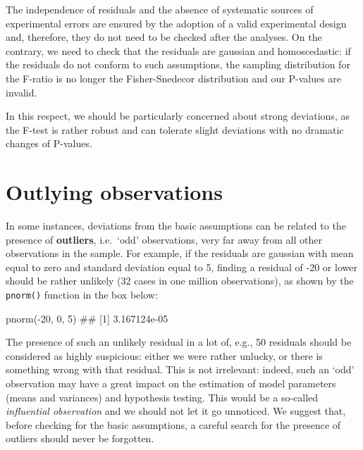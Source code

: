 \documentclass[a4paper,12pt,oneside]{book}
\newenvironment{Shaded}{\begin{snugshade}}{\end{snugshade}}
\newcommand{\DecValTok}[1]{#1}
\newcommand{\SpecialCharTok}[1]{#1}
\newcommand{\DocumentationTok}[1]{#1}
\newcommand{\FunctionTok}[1]{#1}
\newcommand{\NormalTok}[1]{#1}
\begin{document}
The independence of residuals and the absence of systematic sources of experimental errors are ensured by the adoption of a valid experimental design and, therefore, they do not need to be checked after the analyses. On the contrary, we need to check that the residuals are gaussian and homoscedastic: if the residuals do not conform to such assumptions, the sampling distribution for the F-ratio is no longer the Fisher-Snedecor distribution and our P-values are invalid.

In this respect, we should be particularly concerned about strong deviations, as the F-test is rather robust and can tolerate slight deviations with no dramatic changes of P-values.

\hypertarget{outlying-observations}{%
\section{Outlying observations}\label{outlying-observations}}

In some instances, deviations from the basic assumptions can be related to the presence of \textbf{outliers}, i.e.~`odd' observations, very far away from all other observations in the sample. For example, if the residuals are gaussian with mean equal to zero and standard deviation equal to 5, finding a residual of -20 or lower should be rather unlikely (32 cases in one million observations), as shown by the \texttt{pnorm()} function in the box below:

\begin{Shaded}
\begin{Highlighting}[]
\FunctionTok{pnorm}\NormalTok{(}\SpecialCharTok{{-}}\DecValTok{20}\NormalTok{, }\DecValTok{0}\NormalTok{, }\DecValTok{5}\NormalTok{)}
\DocumentationTok{\#\# [1] 3.167124e{-}05}
\end{Highlighting}
\end{Shaded}

The presence of such an unlikely residual in a lot of, e.g., 50 residuals should be considered as highly suspicious: either we were rather unlucky, or there is something wrong with that residual. This is not irrelevant: indeed, such an `odd' observation may have a great impact on the estimation of model parameters (means and variances) and hypothesis testing. This would be a so-called \emph{influential observation} and we should not let it go unnoticed. We suggest that, before checking for the basic assumptions, a careful search for the presence of outliers should never be forgotten.
\end{document}
